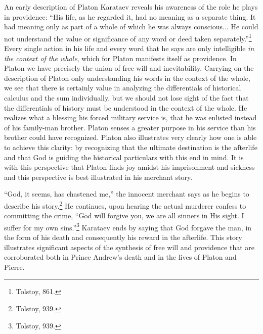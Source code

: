 \documentclass[12pt]{article}
\begin{document}
An early description of Platon Karataev reveals his awareness of the role he plays in providence: ``His life, as he regarded it, had no meaning as a separate thing. It had meaning only as part of a whole of which he was always conscious... He could not understand the value or significance of any word or deed taken separately.''\footnote{Tolstoy, 861.} Every single action in his life and every word that he says are only intelligible \emph{in the context of the whole}, which for Platon manifests itself as providence. In Platon we have precisely the union of free will and inevitability. Carrying on the description of Platon only understanding his words in the context of the whole, we see that there is certainly value in analyzing the differentials of historical calculus and the sum individually, but we should not lose sight of the fact that the differentials of history must be understood in the context of the whole. He realizes what a blessing his forced military service is, that he was enlisted instead of his family-man brother.  Platon senses a greater purpose in his service than his brother could have recognized. Platon also illustrates very clearly how one is able to achieve this clarity: by recognizing that the ultimate destination is the afterlife and that God is guiding the historical particulars with this end in mind. It is with this perspective that Platon finds joy amidst his imprisonment and sickness and this perspective is best illustrated in his merchant story.

 ``God, it seems, has chastened me,'' the innocent merchant says as he begins to describe his story.\footnote{Tolstoy, 939.} He continues, upon hearing the actual murderer confess to committing the crime, ``God will forgive you, we are all sinners in His sight. I suffer for my own sins.''\footnote{Tolstoy, 939.} Karataev ends by saying that God forgave the man, in the form of his death and consequently his reward in the afterlife. This story illustrates significant aspects of the synthesis of free will and providence that are corroborated both in Prince Andrew's death and in the lives of Platon and Pierre.
 
\end{document}

